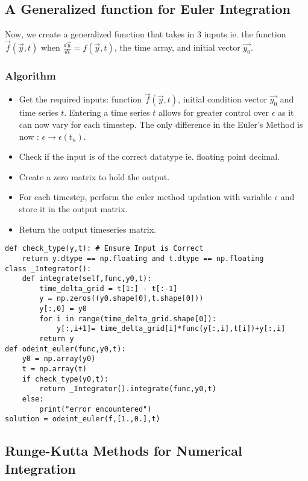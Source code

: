 \documentclass[10pt,letterpaper]{article}
\begin{document}
\subsection*{A Generalized function for Euler Integration}

Now, we create a generalized function that takes in 3 inputs ie. the function $\vec{f}(\vec{y},t)$ when $\frac{d\vec{y}}{dt}=f(\vec{y},t)$, the time array, and initial vector $\vec{y_0}$.

\subsubsection*{Algorithm}

\begin{itemize}
\item Get the required inputs: function $\vec{f}(\vec{y},t)$, initial condition vector $\vec{y_0}$ and time series $t$. Entering a time series $t$ allows for greater control over $\epsilon$ as it can now vary for each timestep. The only difference in the Euler's Method is now : $\epsilon\rightarrow\epsilon(t_n)$.
\item Check if the input is of the correct datatype ie. floating point decimal.
\item Create a zero matrix to hold the output.
\item For each timestep, perform the euler method updation with variable $\epsilon$ and store it in the output matrix.
\item Return the output timeseries matrix.
\end{itemize}

\begin{verbatim}
def check_type(y,t): # Ensure Input is Correct
    return y.dtype == np.floating and t.dtype == np.floating
class _Integrator():
    def integrate(self,func,y0,t):
        time_delta_grid = t[1:] - t[:-1]
        y = np.zeros((y0.shape[0],t.shape[0]))
        y[:,0] = y0
        for i in range(time_delta_grid.shape[0]):
            y[:,i+1]= time_delta_grid[i]*func(y[:,i],t[i])+y[:,i]
        return y
def odeint_euler(func,y0,t):
    y0 = np.array(y0)
    t = np.array(t)
    if check_type(y0,t):
        return _Integrator().integrate(func,y0,t)
    else:
        print("error encountered")
solution = odeint_euler(f,[1.,0.],t)
\end{verbatim}

\subsection*{Runge-Kutta Methods for Numerical Integration}
\end{document}

